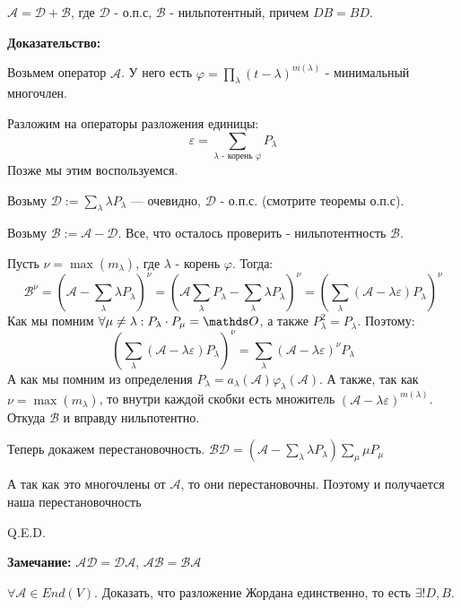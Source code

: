 $\mathcal{A} = \mathcal{D} +\mathcal{B} $, где $\mathcal{D}$ - о.п.с, $\mathcal{B}$ - нильпотентный, причем $DB =BD$.

\textbf{Доказательство:}

Возьмем оператор $\mathcal{A}$. У него есть $\varphi = \prod\limits_{\lambda}(t-\lambda)^{m(\lambda)}$ - минимальный многочлен.

Разложим на операторы разложения единицы:
$$\varepsilon = \sum\limits_{\lambda\text{ -  корень $\varphi$}}P_{\lambda}$$
Позже мы этим воспользуемся.

Возьму $\mathcal{D}:= \sum\limits_{\lambda}\lambda P_{\lambda}$ --- очевидно, $\mathcal{D}$ - о.п.с. (смотрите теоремы о.п.с).

Возьму $\mathcal{B}:= \mathcal{A}-\mathcal{D}$. Все, что осталось проверить - нильпотентность $\mathcal{B}$.

Пусть $\nu = \max (m_{\lambda})$, где $\lambda$ - корень $\varphi$. Тогда:
$$\mathcal{B}^{\nu} = \left(\mathcal{A}-\sum\limits_{\lambda}\lambda P_\lambda\right)^\nu = \left(\mathcal{A}\sum\limits_{\lambda}P_{\lambda }- \sum\limits_{\lambda}\lambda P_{\lambda}\right)^\nu = \left(\sum\limits_{\lambda}\left(\mathcal{A-\lambda\varepsilon}\right)P_{\lambda}\right)^\nu$$
Как мы помним $\forall \mu\neq \lambda:P_\lambda\cdot P_{\mu}=\zero$, а также $P_{\lambda}^2=P_\lambda$. Поэтому:
$$\left(\sum\limits_{\lambda}\left(\mathcal{A}-\lambda\varepsilon\right)P_{\lambda}\right)^\nu = \sum\limits_{\lambda}\left(\mathcal{A}-\lambda\varepsilon\right)^\nu P_\lambda$$
А как мы помним из определения $P_\lambda = a_\lambda(\mathcal{A})\varphi_\lambda(\mathcal{A})$. А также, так как $\nu = \max(m_\lambda)$, то внутри каждой скобки есть множитель $(\mathcal{A}-\lambda\varepsilon)^{m(\lambda)}$. Откуда $\mathcal{B}$ и вправду нильпотентно.

Теперь докажем перестановочность.
$\mathcal{B}\mathcal{D} = \left(\mathcal{A}-\sum\limits_{\lambda}\lambda P_\lambda\right)\sum\limits_{\mu}\mu P_{\mu}$

А так как это многочлены от $\mathcal{A}$, то они перестановочны.  Поэтому и получается наша перестановочность

 \hfill Q.E.D.

\textbf{Замечание:} $\mathcal{A}\mathcal{D} = \mathcal{D} \mathcal{A}$, $\mathcal{A}\mathcal{B} = \mathcal{B} \mathcal{A}$


$\forall \mathcal{A} \in End(V)$. Доказать, что разложение Жордана единственно, то есть $\exists! D, B$.

